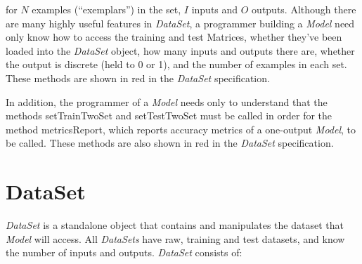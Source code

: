 \documentclass{report}
\def\beginred{\color{red}}
\def\endcolor{\color{black}}
\begin{document}
for $N$ examples (``exemplars'') in the set, $I$ inputs and $O$
outputs.  Although there are many highly useful features in {\em
DataSet}, a programmer building a {\em Model} need only know how to
access the training and test Matrices, whether they've been loaded
into the {\em DataSet} object, how many inputs and outputs there are,
whether the output is discrete (held to 0 or 1), and the number of
examples in each set.  These methods are shown in \beginred red
\endcolor in the {\em DataSet} specification.

In addition, the programmer of a {\em Model} needs only to understand
that the methods setTrainTwoSet and setTestTwoSet must be called in
order for the method metricsReport, which reports accuracy metrics of
a one-output {\em Model}, to be called.  These methods are also shown
in \beginred red \endcolor in the {\em DataSet} specification.

\section{DataSet}

{\em DataSet} is a standalone object that contains and manipulates the
dataset that {\em Model} will access.  All {\em DataSets} have raw,
training and test datasets, and know the number of inputs and
outputs. {\em DataSet} consists of:
\end{document}
